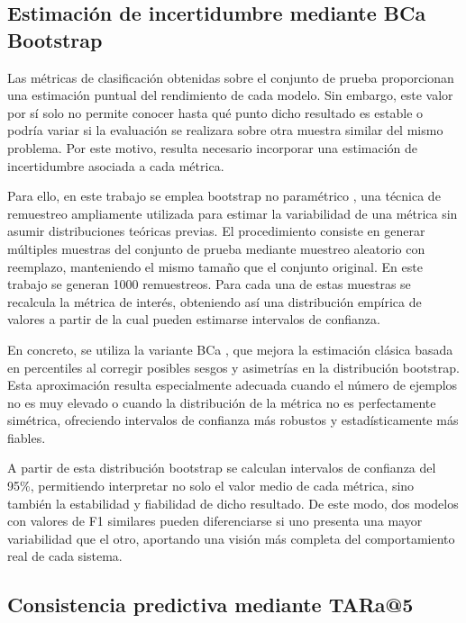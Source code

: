 \subsection{Estimación de incertidumbre mediante BCa Bootstrap}

Las métricas de clasificación obtenidas sobre el conjunto de prueba proporcionan una estimación puntual del rendimiento de cada modelo. Sin embargo, este valor por sí solo no permite conocer hasta qué punto dicho resultado es estable o podría variar si la evaluación se realizara sobre otra muestra similar del mismo problema. Por este motivo, resulta necesario incorporar una estimación de incertidumbre asociada a cada métrica.

Para ello, en este trabajo se emplea bootstrap no paramétrico \cite{efron_bootstrap_1992}, una técnica de remuestreo ampliamente utilizada para estimar la variabilidad de una métrica sin asumir distribuciones teóricas previas. El procedimiento consiste en generar múltiples muestras del conjunto de prueba mediante muestreo aleatorio con reemplazo, manteniendo el mismo tamaño que el conjunto original. En este trabajo se generan 1000 remuestreos. Para cada una de estas muestras se recalcula la métrica de interés, obteniendo así una distribución empírica de valores a partir de la cual pueden estimarse intervalos de confianza.

En concreto, se utiliza la variante \ac{BCa} \cite{efron_better_1987}, que mejora la estimación clásica basada en percentiles al corregir posibles sesgos y asimetrías en la distribución bootstrap. Esta aproximación resulta especialmente adecuada cuando el número de ejemplos no es muy elevado o cuando la distribución de la métrica no es perfectamente simétrica, ofreciendo intervalos de confianza más robustos y estadísticamente más fiables.

A partir de esta distribución bootstrap se calculan intervalos de confianza del 95\%, permitiendo interpretar no solo el valor medio de cada métrica, sino también la estabilidad y fiabilidad de dicho resultado. De este modo, dos modelos con valores de F1 similares pueden diferenciarse si uno presenta una mayor variabilidad que el otro, aportando una visión más completa del comportamiento real de cada sistema.

\subsection{Consistencia predictiva mediante TARa@5}
\label{subsec:tara5}

